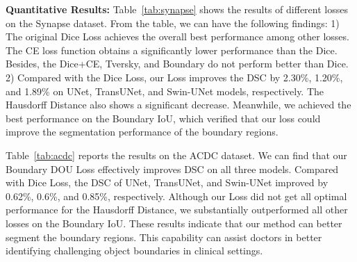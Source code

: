 \documentclass[runningheads]{llncs}
\begin{document}
\noindent\textbf{Quantitative Results:} Table~\ref{tab:synapse} shows the results of different losses on the Synapse dataset. From the table, we can have the following findings: 1) The original Dice Loss achieves the overall best performance among other losses. The CE loss function obtains a significantly lower performance than the Dice. Besides, the Dice+CE, Tversky, and Boundary do not perform better than Dice. 2) Compared with the Dice Loss, our Loss improves the DSC by 2.30\%, 1.20\%, and 1.89\% on UNet, TransUNet, and Swin-UNet models, respectively. The Hausdorff Distance also shows a significant decrease. Meanwhile, we achieved the best performance on the Boundary IoU, which verified that our loss could improve the segmentation performance of the boundary regions.



Table~\ref{tab:acdc} reports the results on the ACDC dataset. We can find that our Boundary DOU Loss effectively improves DSC on all three models. Compared with Dice Loss, the DSC of UNet, TransUNet, and Swin-UNet improved by 0.62\%, 0.6\%, and 0.85\%, respectively. Although our Loss did not get all optimal performance for the Hausdorff Distance, we substantially outperformed all other losses on the Boundary IoU. These results indicate that our method can better segment the boundary regions. This capability can assist doctors in better identifying challenging object boundaries in clinical settings.
\end{document}
